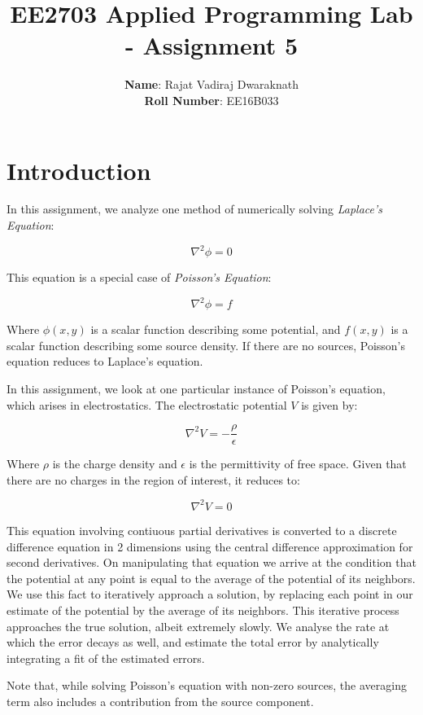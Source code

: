 \documentclass[11pt]{article}
\title{EE2703 Applied Programming Lab - Assignment 5}
\author{
  \textbf{Name}: Rajat Vadiraj Dwaraknath\\
  \textbf{Roll Number}: EE16B033
}
\begin{document}
    
    
    \maketitle
    
    

    
	

	
		
    \section{Introduction}\label{introduction}

In this assignment, we analyze one method of numerically solving
\emph{Laplace's Equation}:

\[\nabla^2 \phi = 0\]

This equation is a special case of \emph{Poisson's Equation}:

\[\nabla^2 \phi = f\]

Where \(\phi(x,y)\) is a scalar function describing some potential, and
\(f(x,y)\) is a scalar function describing some source density. If there
are no sources, Poisson's equation reduces to Laplace's equation.

In this assignment, we look at one particular instance of Poisson's
equation, which arises in electrostatics. The electrostatic potential
\(V\) is given by:

\[\nabla^2 V = -\frac{\rho}{\epsilon}\]

Where \(\rho\) is the charge density and \(\epsilon\) is the
permittivity of free space. Given that there are no charges in the
region of interest, it reduces to:

\[\nabla^2 V = 0\]

This equation involving contiuous partial derivatives is converted to a
discrete difference equation in 2 dimensions using the central
difference approximation for second derivatives. On manipulating that
equation we arrive at the condition that the potential at any point is
equal to the average of the potential of its neighbors. We use this fact
to iteratively approach a solution, by replacing each point in our
estimate of the potential by the average of its neighbors. This
iterative process approaches the true solution, albeit extremely slowly.
We analyse the rate at which the error decays as well, and estimate the
total error by analytically integrating a fit of the estimated errors.

Note that, while solving Poisson's equation with non-zero sources, the
averaging term also includes a contribution from the source component.
\end{document}
